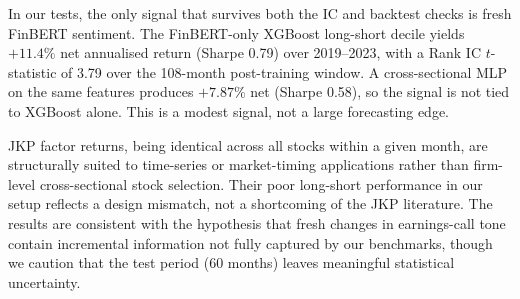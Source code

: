 In our tests, the only signal that survives both the IC and backtest checks is fresh FinBERT sentiment. The FinBERT-only XGBoost long-short decile yields $+11.4\%$ net annualised return (Sharpe 0.79) over 2019--2023, with a Rank IC $t$-statistic of 3.79 over the 108-month post-training window. A cross-sectional MLP on the same features produces $+7.87\%$ net (Sharpe 0.58), so the signal is not tied to XGBoost alone. This is a modest signal, not a large forecasting edge.

JKP factor returns, being identical across all stocks within a given month, are structurally suited to time-series or market-timing applications rather than firm-level cross-sectional stock selection. Their poor long-short performance in our setup reflects a design mismatch, not a shortcoming of the JKP literature. The results are consistent with the hypothesis that fresh changes in earnings-call tone contain incremental information not fully captured by our benchmarks, though we caution that the test period (60 months) leaves meaningful statistical uncertainty.
